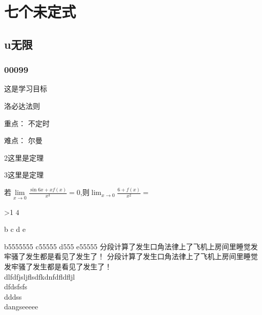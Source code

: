\section{七个未定式}
\subsection{u无限}
\subsubsection{00099}

\begin{LearnningObjectivesBox}[3]
\begin{learningtargets}
	\item 这是学习目标
	\item 洛必达法则
\end{learningtargets}
\end{LearnningObjectivesBox}
\begin{KeyandDifficultyBox}[3]
\begin{learningkeys}
\item[重点：]  不定时
\item[难点：] 尔曼
\end{learningkeys}
\end{KeyandDifficultyBox}

\begin{Theorems}
	2这里是定理
	\end{Theorems}

	\begin{Theorems}
	3这里是定理
	\end{Theorems}

\begin{examples}
	若$\lim\limits_{x\to0}{\frac{\sin{6x}+xf(x)}{x^3}}=0$,则$\lim_{x\to0}{\frac{6+f(x)}{x^2}}=$

\end{examples}


\ifnum \value{page}>1
	$4$
\fi

			{b}
			{c}
			{d}
			{e}

			{b5555555}
			{c55555}
			{d555}
			{e55555}
			分段计算了发生口角法律上了飞机上房间里睡觉发牢骚了发生都是看见了发生了！
			分段计算了发生口角法律上了飞机上房间里睡觉发牢骚了发生都是看见了发生了！\\
	dlfdfjsljflsdfkdnfdfldfljl \\
	dfdsfsfs \\
	dddss\\
	dangseeeee

